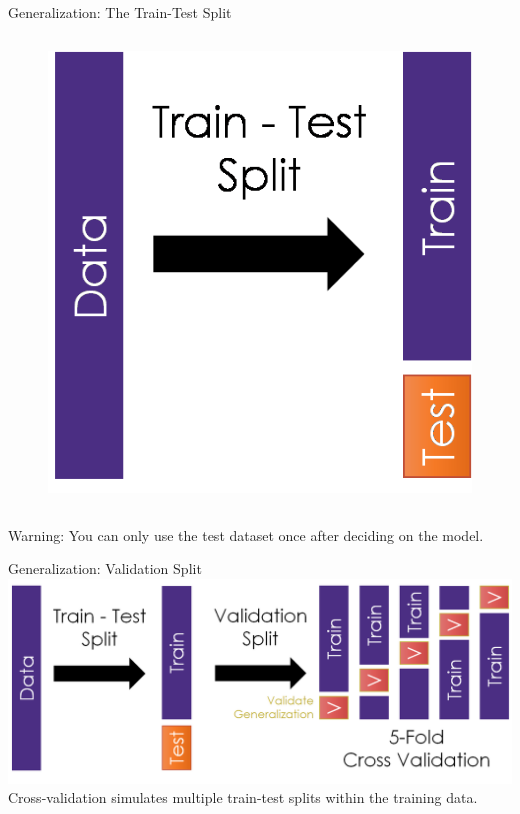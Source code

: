 \documentclass[aspectratio=169]{../latex_main/tntbeamer}  %
\begin{document}
\begin{frame}{Generalization: The Train-Test Split}
\begin{columns}
	        
	       \begin{column}{.5\textwidth}
	                \begin{figure}
	                    \includegraphics[scale=.5]{Bild3}
	                \end{figure}
	        \end{column}
	    \end{columns}
	    \bigskip
	    \alert{Warning:} You can only use the test dataset once after deciding on the model.

	\end{frame}
	
	\begin{frame}{Generalization: Validation Split}
	    \includegraphics[scale=.43]{Bild4}\\
	    Cross-validation simulates multiple train-test splits within the training data.

	\end{frame}
	
\end{document}
